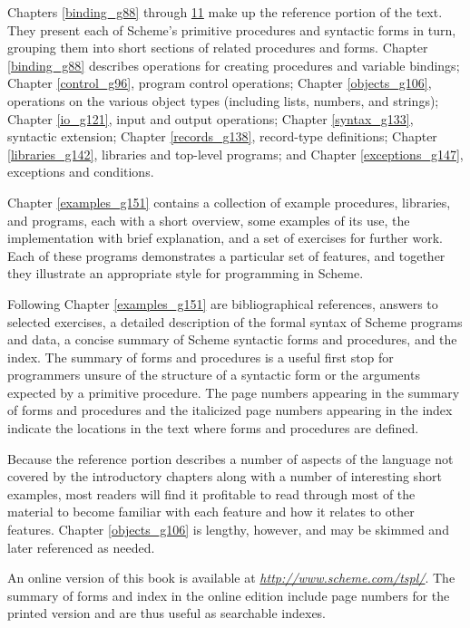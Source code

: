 Chapters \ref{binding_g88} through \hyperref[exceptions_g147]{11} make up the reference
portion of the text.
They present each of Scheme's primitive procedures and syntactic
forms in turn, grouping them into short sections of related procedures
and forms.
Chapter \ref{binding_g88} describes operations for creating procedures
and variable bindings;
Chapter \ref{control_g96}, program control operations;
Chapter \ref{objects_g106}, operations on the various object types
(including lists, numbers, and strings);
Chapter \ref{io_g121}, input and output operations;
Chapter \ref{syntax_g133}, syntactic extension;
Chapter \ref{records_g138}, record-type definitions;
Chapter \ref{libraries_g142}, libraries and top-level programs; and
Chapter \ref{exceptions_g147}, exceptions and conditions.


Chapter \ref{examples_g151} contains a collection of example procedures,
libraries, and programs, each with a short overview, some examples of
its use, the implementation with brief explanation, and a set of
exercises for further work.
Each of these programs demonstrates a particular set of features,
and together they illustrate an appropriate style for
programming in Scheme.


Following Chapter \ref{examples_g151} are
bibliographical references,
answers to selected exercises,
a detailed description of the formal syntax of Scheme programs and data,
a concise summary of Scheme syntactic forms and procedures,
and
the index.
The summary of forms and procedures is a useful first stop for
programmers unsure of the structure of a syntactic form or the
arguments expected by a primitive procedure.
The page numbers appearing in the summary of forms and procedures and
the italicized page numbers appearing in the index indicate the
locations in the text where forms and procedures are defined.


Because the reference portion describes a number of aspects of the
language not covered by the introductory chapters along with a number
of interesting short examples,
most readers will find it profitable to read through most of the
material to become familiar with each feature and how it relates to
other features.
Chapter \ref{objects_g106} is lengthy, however, and may be skimmed
and later referenced as needed.


An online version of this book is available at \href{http://www.scheme.com/tspl/}{\textit{http://www.scheme.com/tspl/}}.
The summary of forms and index in the online edition include page
numbers for the printed version and are thus useful as searchable
indexes.


